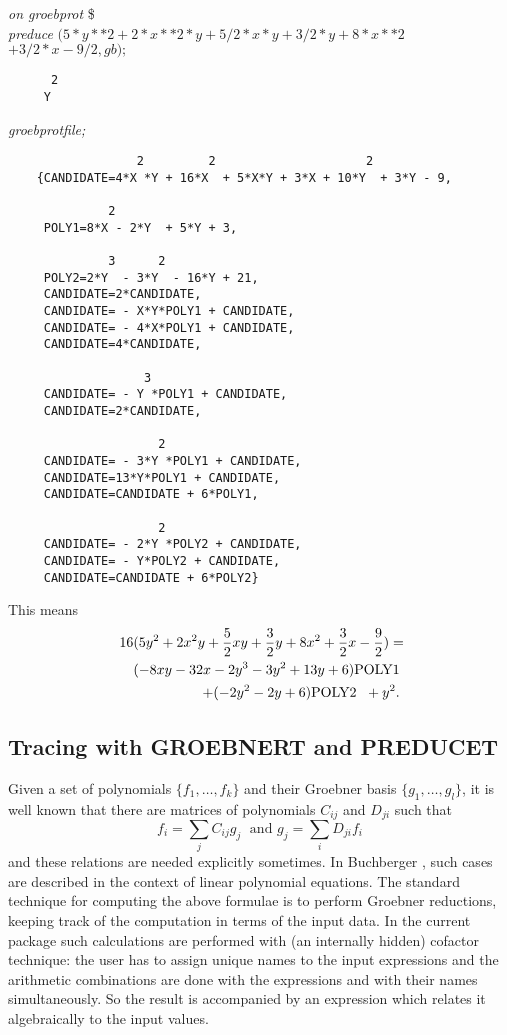 \example {}

{\it on groebprot} \$ \\
{\it preduce} $ (5*y**2 + 2*x**2*y + 5/2*x*y + 3/2*y + 8*x**2 $ \\
\hspace*{+1cm} $+ 3/2*x - 9/2, gb);$
\begin{verbatim}
      2
     Y
\end{verbatim}
{\it groebprotfile;}
\begin{verbatim}
                  2         2                     2
    {CANDIDATE=4*X *Y + 16*X  + 5*X*Y + 3*X + 10*Y  + 3*Y - 9,

              2
     POLY1=8*X - 2*Y  + 5*Y + 3,

              3      2
     POLY2=2*Y  - 3*Y  - 16*Y + 21,
     CANDIDATE=2*CANDIDATE,
     CANDIDATE= - X*Y*POLY1 + CANDIDATE,
     CANDIDATE= - 4*X*POLY1 + CANDIDATE,
     CANDIDATE=4*CANDIDATE,

                   3
     CANDIDATE= - Y *POLY1 + CANDIDATE,
     CANDIDATE=2*CANDIDATE,

                     2
     CANDIDATE= - 3*Y *POLY1 + CANDIDATE,
     CANDIDATE=13*Y*POLY1 + CANDIDATE,
     CANDIDATE=CANDIDATE + 6*POLY1,

                     2
     CANDIDATE= - 2*Y *POLY2 + CANDIDATE,
     CANDIDATE= - Y*POLY2 + CANDIDATE,
     CANDIDATE=CANDIDATE + 6*POLY2}

 \end{verbatim}
This means
\begin{eqnarray*}
\lefteqn{
16 (5 y^2 + 2 x^2 y + \frac{5}{2} x y + \frac{3}{2} y + 8 x^2+ \frac{3}{2} x -
\frac{9}{2})=} \\ & &
(-8 x y -32 x -2 y^3 -3 y^2 + 13 y + 6) \mbox{POLY1} \\
& & \; + (-2 y^2 -2 y + 6) \mbox{POLY2  } \; + y^2.
\end{eqnarray*}




\subsection{Tracing with GROEBNERT and PREDUCET}
Given a set of polynomials $\{f_1,\ldots ,f_k\}$ and their Groebner
basis $\{g_1,\ldots ,g_l\}$, it is well known that there are matrices of
polynomials $C_{ij}$ and $D_{ji}$ such that
\[
f_i = \displaystyle{\sum\limits_j} C_{ij} g_j \;\mbox{  and  } g_j =
\displaystyle{\sum\limits_i} D_{ji} f_i
\]
and these relations are needed explicitly sometimes.
In {\sc Buchberger} \cite{Buchberger:85}, such cases are described in the
context of linear polynomial equations. The standard technique for
computing the above formulae is to perform
Groebner reductions, keeping track of the
computation in terms of the input data. In the current package such
calculations are performed with (an internally hidden) cofactor
technique: the user has to assign unique names to the input
expressions and the  arithmetic combinations are done with the
expressions and with their names simultaneously. So the result is
accompanied by an expression which relates it algebraically to the
input values.

